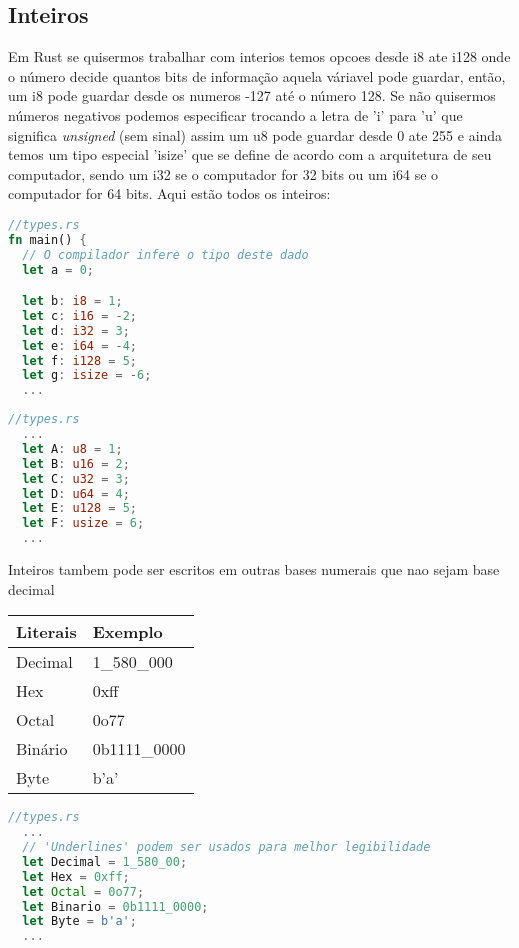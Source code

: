 \subsection{Inteiros}
Em Rust se quisermos trabalhar com interios temos opcoes desde i8 ate i128 onde o número decide quantos bits de informação aquela váriavel pode guardar, então, um i8 pode guardar desde os numeros -127 até o número 128. Se não quisermos números negativos podemos especificar trocando a letra de 'i' para 'u' que significa \textit{unsigned} (sem sinal) assim um u8 pode guardar desde 0 ate 255 e ainda temos um tipo especial 'isize' que se define de acordo com a arquitetura de seu computador, sendo um i32 se o computador for 32 bits ou um i64 se o computador for 64 bits. Aqui estão todos os inteiros:
\begin{lstlisting}[language=rust]
//types.rs
fn main() {
  // O compilador infere o tipo deste dado 
  let a = 0; 

  let b: i8 = 1;
  let c: i16 = -2;
  let d: i32 = 3;
  let e: i64 = -4;
  let f: i128 = 5;
  let g: isize = -6;
  ...
\end{lstlisting}
\newpage
\begin{lstlisting}[language=rust]
//types.rs
  ...
  let A: u8 = 1;
  let B: u16 = 2;
  let C: u32 = 3;
  let D: u64 = 4;
  let E: u128 = 5;
  let F: usize = 6;
  ...
\end{lstlisting}
\par
Inteiros tambem pode ser escritos em outras bases numerais que nao sejam base decimal
\par
\begin{table}[h]
\centering
\begin{tabular}{|l|l|}
\hline
Literais & Exemplo      \\ \hline
Decimal  & 1\_580\_000  \\ \hline
Hex      & 0xff         \\ \hline
Octal    & 0o77         \\ \hline
Binário  & 0b1111\_0000 \\ \hline
Byte     & b'a'         \\ \hline
\end{tabular}
\end{table}

\begin{lstlisting}[language=rust]
//types.rs
  ...
  // 'Underlines' podem ser usados para melhor legibilidade
  let Decimal = 1_580_00;
  let Hex = 0xff;
  let Octal = 0o77;
  let Binario = 0b1111_0000;
  let Byte = b'a';
  ...
\end{lstlisting}


